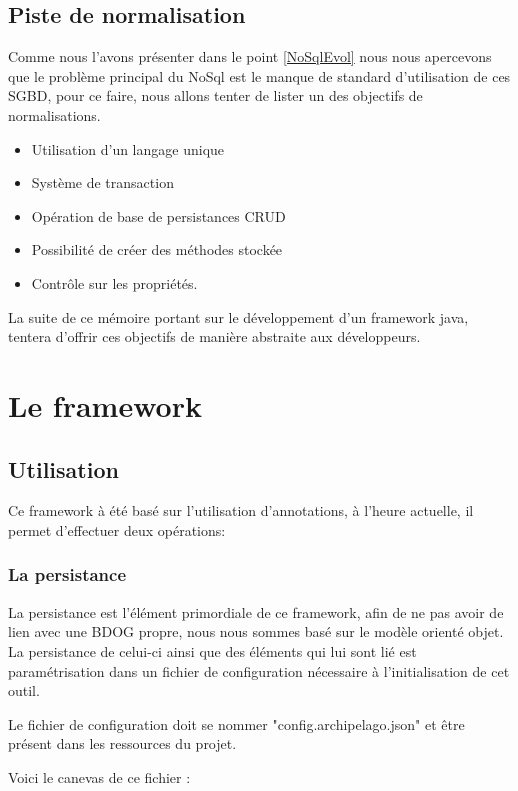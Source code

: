 \documentclass[a4paper,fleqn,12pt]{report}
\begin{document}
\section{Piste de normalisation}

Comme nous l'avons présenter dans le point \ref{NoSqlEvol} nous nous apercevons que le problème principal du NoSql est le manque de standard d'utilisation de ces SGBD, pour ce faire, nous allons tenter de lister un des objectifs de normalisations.

\begin{itemize}
\item Utilisation d'un langage unique
\item Système de transaction 
\item Opération de base de persistances CRUD
\item Possibilité de créer des méthodes stockée 
\item Contrôle sur les propriétés.
\end{itemize}

La suite de ce mémoire portant sur le développement d'un framework java, tentera d'offrir ces objectifs de manière abstraite aux développeurs.

\chapter{Le framework}
\section{Utilisation}

Ce framework à été basé sur l'utilisation d'annotations, à l'heure actuelle, il permet d'effectuer deux opérations:

\subsection{La persistance}

La persistance est l'élément primordiale de ce framework, afin de ne pas avoir de lien avec une BDOG propre, nous nous sommes basé sur le modèle orienté objet. La persistance de celui-ci ainsi que des éléments qui lui sont lié est paramétrisation dans un fichier de configuration nécessaire à l'initialisation de cet outil.

Le fichier de configuration doit se nommer "config.archipelago.json" et être présent dans les ressources du projet.

Voici le canevas de ce fichier :
\end{document}
